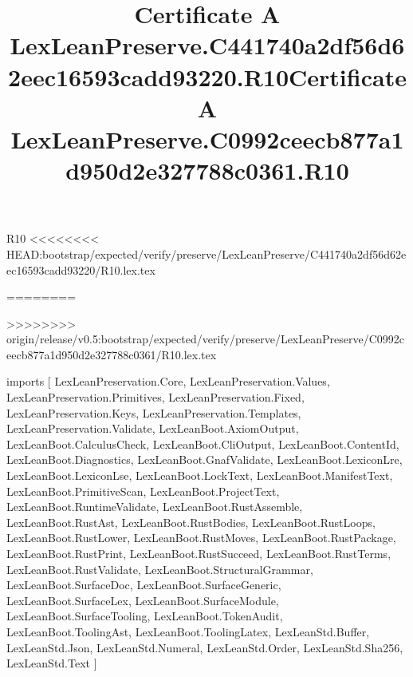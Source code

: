 \begin{lexlean}{R10}
<<<<<<<< HEAD:bootstrap/expected/verify/preserve/LexLeanPreserve/C441740a2df56d62eec16593cadd93220/R10.lex.tex
\title{Certificate A LexLeanPreserve.C441740a2df56d62eec16593cadd93220.R10}
========
\title{Certificate A LexLeanPreserve.C0992ceecb877a1d950d2e327788c0361.R10}
>>>>>>>> origin/release/v0.5:bootstrap/expected/verify/preserve/LexLeanPreserve/C0992ceecb877a1d950d2e327788c0361/R10.lex.tex
\begin{coremodule}
imports [
  LexLeanPreservation.Core,
  LexLeanPreservation.Values,
  LexLeanPreservation.Primitives,
  LexLeanPreservation.Fixed,
  LexLeanPreservation.Keys,
  LexLeanPreservation.Templates,
  LexLeanPreservation.Validate,
  LexLeanBoot.AxiomOutput,
  LexLeanBoot.CalculusCheck,
  LexLeanBoot.CliOutput,
  LexLeanBoot.ContentId,
  LexLeanBoot.Diagnostics,
  LexLeanBoot.GnafValidate,
  LexLeanBoot.LexiconLre,
  LexLeanBoot.LexiconLse,
  LexLeanBoot.LockText,
  LexLeanBoot.ManifestText,
  LexLeanBoot.PrimitiveScan,
  LexLeanBoot.ProjectText,
  LexLeanBoot.RuntimeValidate,
  LexLeanBoot.RustAssemble,
  LexLeanBoot.RustAst,
  LexLeanBoot.RustBodies,
  LexLeanBoot.RustLoops,
  LexLeanBoot.RustLower,
  LexLeanBoot.RustMoves,
  LexLeanBoot.RustPackage,
  LexLeanBoot.RustPrint,
  LexLeanBoot.RustSucceed,
  LexLeanBoot.RustTerms,
  LexLeanBoot.RustValidate,
  LexLeanBoot.StructuralGrammar,
  LexLeanBoot.SurfaceDoc,
  LexLeanBoot.SurfaceGeneric,
  LexLeanBoot.SurfaceLex,
  LexLeanBoot.SurfaceModule,
  LexLeanBoot.SurfaceTooling,
  LexLeanBoot.TokenAudit,
  LexLeanBoot.ToolingAst,
  LexLeanBoot.ToolingLatex,
  LexLeanStd.Buffer,
  LexLeanStd.Json,
  LexLeanStd.Numeral,
  LexLeanStd.Order,
  LexLeanStd.Sha256,
  LexLeanStd.Text
]


\end{coremodule}
\end{lexlean}
